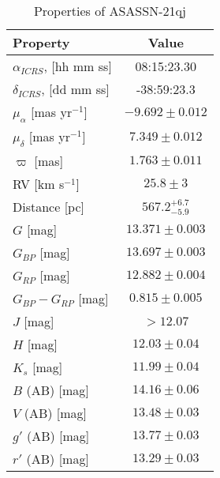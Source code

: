 \documentclass[sn-nature]{sn-jnl}%
\newcommand{\asas}{ASASSN-21qj}
\begin{document}
\begin{table}
    \centering
    \caption{Properties of \asas}
    \begin{tabular}{@{}lc@{}}
    \hline\hline
Property                               & Value                    \\
        \hline
         $\alpha_{ICRS}$, {[}hh mm ss{]}  & 08:15:23.30\footnotemark[1]  \\
         $\delta_{ICRS}$, {[}dd mm ss{]}  & -38:59:23.3\footnotemark[1]  \\
         $\mu_{\alpha}$ {[}mas yr$^{-1}${]}     & $-9.692\pm0.012$\footnotemark[1]   \\
         $\mu_{\delta}$ {[}mas yr$^{-1}${]}     & $7.349\pm0.012$\footnotemark[1]  \\
         $\varpi$ {[}mas{]}                     & $1.763\pm0.011$\footnotemark[1]   \\
         RV {[}km s$^{-1}${]}                   & $25.8\pm3$\footnotemark[1] \\
         Distance {[}pc{]}                      & $567.2^{+6.7}_{-5.9}$\footnotemark[2] \\ 
        \hline
         $G$ {[}mag{]}                          & $13.371\pm 0.003$\footnotemark[1]  \\
         $G_{BP}$ {[}mag{]}                     & $13.697\pm 0.003$\footnotemark[1]    \\
         $G_{RP}$ {[}mag{]}                     & $12.882\pm 0.004$\footnotemark[1]   \\
         $G_{BP}-G_{RP}$ {[}mag{]}              & $0.815\pm 0.005$\footnotemark[1]         \\
         $J$ {[}mag{]}                          & $>12.07$\footnotemark[3]   \\
         $H$ {[}mag{]}                          & $12.03\pm0.04$\footnotemark[3]    \\
         $K_s$ {[}mag{]}                          & $11.99\pm0.04$\footnotemark[3]    \\
         $B$ (AB) {[}mag{]}                     & $14.16\pm0.06$\footnotemark[4]     \\
         $V$ (AB) {[}mag{]}                     & $13.48\pm0.03$\footnotemark[4]   \\
         $g'$ (AB) {[}mag{]}                     & $13.77\pm0.03$\footnotemark[4]  \\
         $r'$ (AB) {[}mag{]}                     & $13.29\pm0.03$\footnotemark[4]     \\

\end{tabular}
\end{table}
\end{document}
